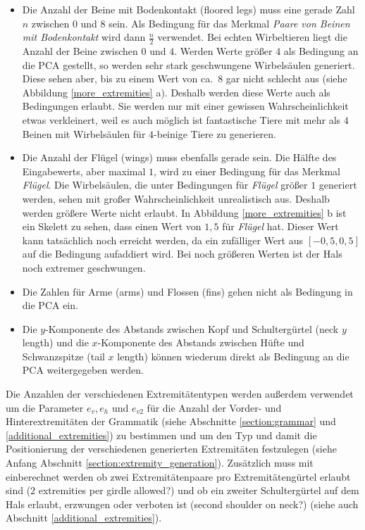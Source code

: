 \begin{itemize}
 \item Die Anzahl der Beine mit Bodenkontakt (floored legs) muss eine gerade Zahl $n$ zwischen $0$ und $8$ sein. Als Bedingung für das Merkmal \emph{Paare von Beinen mit Bodenkontakt} wird dann $\frac{n}{2}$ verwendet. Bei echten Wirbeltieren liegt die Anzahl der Beine zwischen $0$ und $4$. Werden Werte größer $4$ als Bedingung an die PCA gestellt, so werden sehr stark geschwungene Wirbelsäulen generiert. Diese sehen aber, bis zu einem Wert von ca.\ $8$ gar nicht schlecht aus (siehe Abbildung \ref{more_extremities} a). Deshalb werden diese Werte auch als Bedingungen erlaubt. Sie werden nur mit einer gewissen Wahrscheinlichkeit etwas verkleinert, weil es auch möglich ist fantastische Tiere mit mehr als $4$ Beinen mit Wirbelsäulen für $4$-beinige Tiere zu generieren.
 
 \item Die Anzahl der Flügel (wings) muss ebenfalls gerade sein. Die Hälfte des Eingabewerts, aber maximal $1$, wird zu einer Bedingung für das Merkmal \emph{Flügel}.
 Die Wirbelsäulen, die unter Bedingungen für \emph{Flügel} größer $1$ generiert werden, sehen mit großer Wahrscheinlichkeit unrealistisch aus. Deshalb werden größere Werte nicht erlaubt. In Abbildung \ref{more_extremities} b ist ein Skelett zu sehen, dass einen Wert von $1{,}5$ für \emph{Flügel} hat. Dieser Wert kann tatsächlich noch erreicht werden, da ein zufälliger Wert aus $[-0{,}5, 0{,}5]$ auf die Bedingung aufaddiert wird. Bei noch größeren Werten ist der Hals noch extremer geschwungen.
 
 \item Die Zahlen für Arme (arms) und Flossen (fins) gehen nicht als Bedingung in die PCA ein.
 
 \item Die $y$-Komponente des Abstands zwischen Kopf und Schultergürtel (neck $y$ length) und die $x$-Komponente des Abstands zwischen Hüfte und Schwanzspitze (tail $x$ length) können wiederum direkt als Bedingung an die PCA weitergegeben werden.
\end{itemize}

Die Anzahlen der verschiedenen Extremitätentypen werden außerdem verwendet um die Parameter $e_v, e_h$ und $e_{v2}$ für die Anzahl der Vorder- und Hinterextremitäten der Grammatik (siehe Abschnitte \ref{section:grammar} und \ref{additional_extremities}) zu bestimmen und um den Typ und damit die Positionierung der verschiedenen generierten Extremitäten festzulegen (siehe Anfang Abschnitt \ref{section:extremity_generation}). Zusätzlich muss mit einberechnet werden ob zwei Extremitätenpaare pro Extremitätengürtel erlaubt sind ($2$ extremities per girdle allowed?) und ob ein zweiter Schultergürtel auf dem Hals erlaubt, erzwungen oder verboten ist (second shoulder on neck?) (siehe auch Abschnitt \ref{additional_extremities}).

